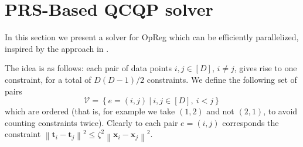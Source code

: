 \documentclass{article}
\newcommand{\norm}[1]{\left\lVert#1\right\rVert}
\newcommand{\tv}{\mathbold{t}}
\newcommand{\x}{\mathbold{x}}
\begin{document}



\newpage 





\newpage
\appendix

\section{PRS-Based QCQP solver}
In this section we present a solver for OpReg which can be efficiently parallelized, inspired by the approach in \cite{simonetto_smooth_2021}.

The idea is as follows: each pair of data points $i, j \in [D]$, $i \neq j$, gives rise to one constraint, for a total of $D(D-1)/2$ constraints. We define the following set of pairs
$$
	\mathcal{V} = \left\{ e = (i,j) \ | \ i, j \in [D], \ i < j \right\}
$$
which are ordered (that is, for example we take $(1,2)$ and not $(2,1)$, to avoid counting constraints twice). Clearly to each pair $e = (i,j)$ corresponds the constraint $\norm{\tv_i - \tv_j}^2 \leq \zeta^2 \norm{\x_i - \x_j}^2$.
\end{document}
